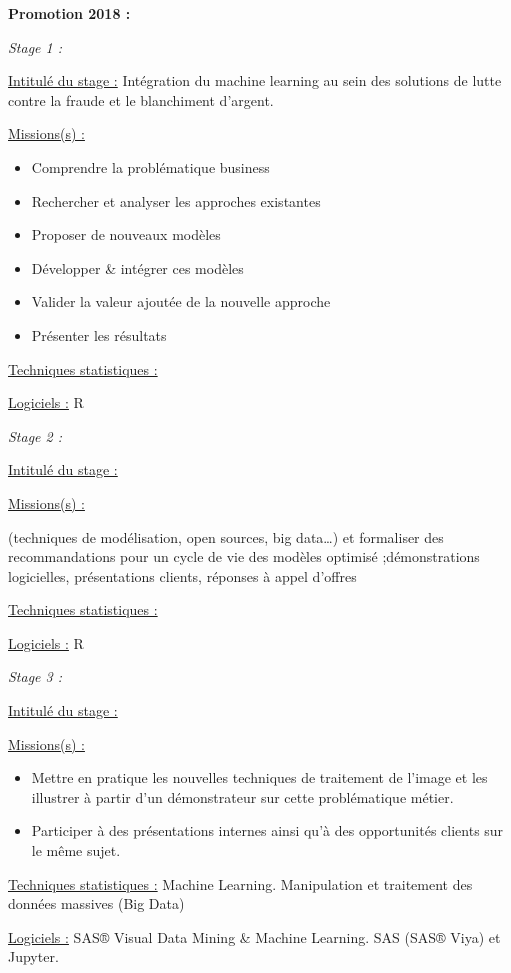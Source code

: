 \documentclass[
  letterpaper,
  DIV=11,
  numbers=noendperiod]{scrreprt}
\begin{document}
\textbf{Promotion 2018 :}

\emph{Stage 1 :}

\uline{Intitulé du stage :} Intégration du machine learning au sein des
solutions de lutte contre la fraude et le blanchiment d'argent.

\uline{Missions(s) :}

\begin{itemize}
\item
  Comprendre la problématique business
\item
  Rechercher et analyser les approches existantes
\item
  Proposer de nouveaux modèles
\item
  Développer \& intégrer ces modèles
\item
  Valider la valeur ajoutée de la nouvelle approche
\item
  Présenter les résultats
\end{itemize}

\uline{Techniques statistiques :}

\uline{Logiciels :} R

\emph{Stage 2 :}

\uline{Intitulé du stage :}

\uline{Missions(s) :}

(techniques de modélisation, open sources, big data\ldots) et formaliser
des recommandations pour un cycle de vie des modèles optimisé
;démonstrations logicielles, présentations clients, réponses à appel
d'offres

\uline{Techniques statistiques :}

\uline{Logiciels :} R

\emph{Stage 3 :}

\uline{Intitulé du stage :}

\uline{Missions(s) :}

\begin{itemize}
\item
  Mettre en pratique les nouvelles techniques de traitement de l'image
  et les illustrer à partir d'un démonstrateur sur cette problématique
  métier.
\item
  Participer à des présentations internes ainsi qu'à des opportunités
  clients sur le même sujet.
\end{itemize}

\uline{Techniques statistiques :} Machine Learning. Manipulation et
traitement des données massives (Big Data)

\uline{Logiciels :} SAS® Visual Data Mining \& Machine Learning. SAS
(SAS® Viya) et Jupyter.
\end{document}

